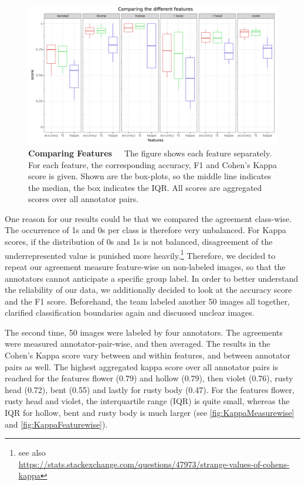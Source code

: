 \begin{figure}[!ht]
	\centering
	\includegraphics[scale=0.55]{Figures/chapter03/kappa_featurewise.png}
	\decoRule
	\caption[Feature-Wise Comparison of Agreement Measure Scores]{\textbf{Comparing Features}~~~The figure shows each feature separately. For each feature, the corresponding accuracy, F1 and Cohen’s Kappa score is given. Shown are the box-plots, so the middle line indicates the median, the box indicates the IQR. All scores are aggregated scores over all annotator pairs.}
	\label{fig:KappaFeaturewise}
\end{figure}

One reason for our results could be that we compared the agreement class-wise. The occurrence of 1s and 0s per class is therefore very unbalanced. For Kappa scores, if the distribution of 0s and 1s is not balanced, disagreement of the underrepresented value is punished more heavily.\footnote{see also \\ \url{https://stats.stackexchange.com/questions/47973/strange-values-of-cohens-kappa}} Therefore, we decided to repeat our agreement measure feature-wise on non-labeled images, so that the annotators cannot anticipate a specific group label. In order to better understand the reliability of our data, we additionally decided to look at the accuracy score and the F1 score.  Beforehand, the team labeled another 50 images all together, clarified classification boundaries again and discussed unclear images.

The second time, 50 images were labeled by four annotators. The agreements were measured annotator-pair-wise, and then averaged. The results in the Cohen’s Kappa score vary between and within features, and between annotator pairs as well. The highest aggregated kappa score over all annotator pairs is reached for the features flower (0.79) and hollow (0.79), then violet (0.76), rusty head (0.72), bent (0.55) and lastly for rusty body (0.47).
For the features flower, rusty head and violet, the interquartile range (IQR) is quite small, whereas the IQR for hollow, bent and rusty body is much larger (see \autoref{fig:KappaMeasurewise} and \autoref{fig:KappaFeaturewise}).

